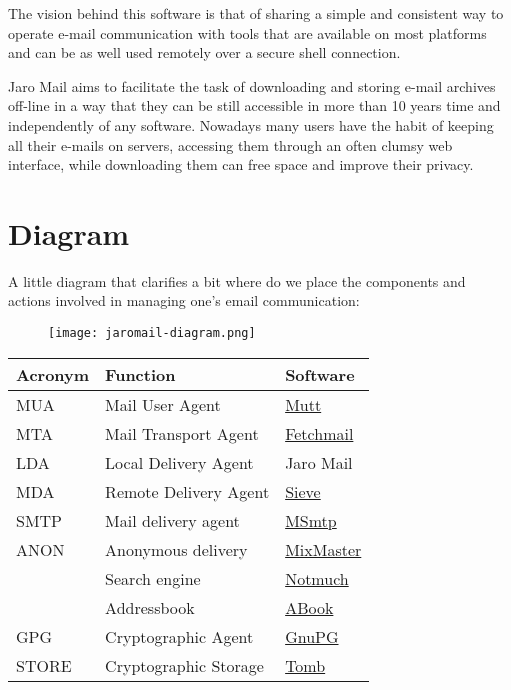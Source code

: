 \documentclass[a4,onecolumn,portrait]{article}
\begin{document}
The vision behind this software is that of sharing a simple and
consistent way to operate e-mail communication with tools that are
available on most platforms and can be as well used remotely over a
secure shell connection.

Jaro Mail aims to facilitate the task of downloading and storing e-mail
archives off-line in a way that they can be still accessible in more
than 10 years time and independently of any software. Nowadays many
users have the habit of keeping all their e-mails on servers,
accessing them through an often clumsy web interface, while
downloading them can free space and improve their privacy.

\pagebreak
\section{Diagram}
\label{sec-2}

A little diagram that clarifies a bit where do we place the components
and actions involved in managing one's email communication:

\begin{figure}
  \begin{center}
    \texttt{[image: jaromail-diagram.png]}
  \end{center}
\end{figure}
\begin{center}
\begin{tabular}{lll}
Acronym & Function & Software\\
\hline
MUA & Mail User Agent & \href{http://www.mutt.org}{Mutt}\\
MTA & Mail Transport Agent & \href{http://www.fetchmail.info}{Fetchmail}\\
LDA & Local Delivery Agent & Jaro Mail\\
MDA & Remote Delivery Agent & \href{http://en.wikipedia.org/wiki/Sieve_(mail_filtering_language)}{Sieve}\\
SMTP & Mail delivery agent & \href{http://msmtp.sourceforge.net}{MSmtp}\\
ANON & Anonymous delivery & \href{http://mixmaster.sourceforge.net/}{MixMaster}\\
 & Search engine & \href{http://notmuchmail.org/}{Notmuch}\\
 & Addressbook & \href{http://abook.sf.net}{ABook}\\
GPG & Cryptographic Agent & \href{http://www.gnupg.org}{GnuPG}\\
STORE & Cryptographic Storage & \href{http://www.dyne.org/software/Tomb}{Tomb}\\
\end{tabular}
\end{center}
\end{document}
